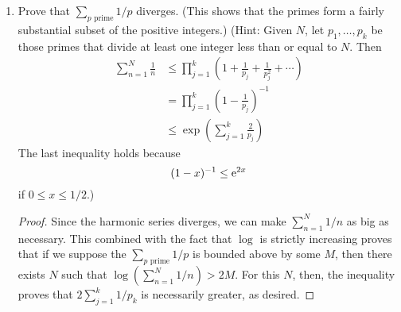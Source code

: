 \documentclass[../psets.tex]{subfiles}
\begin{document}
\begin{enumerate}[label={\textbf{\arabic*.}}]
\begin{enumerate}
\begin{proof}
            $f$ can be strictly increasing, constant, or strictly decreasing.
        \end{proof}
    \end{enumerate}
    \setcounter{enumi}{9}
    \item Prove that $\sum_{p\text{ prime}}1/p$ diverges. (This shows that the primes form a fairly substantial subset of the positive integers.) (Hint: Given $N$, let $p_1,\dots,p_k$ be those primes that divide at least one integer less than or equal to $N$. Then
    \begin{align*}
        \sum_{n=1}^N\frac{1}{n} &\leq \prod_{j=1}^k\left( 1+\frac{1}{p_j}+\frac{1}{p_j^2}+\cdots \right)\\
        &= \prod_{j=1}^k\left( 1-\frac{1}{p_j} \right)^{-1}\\
        &\leq \exp\left( \sum_{j=1}^k\frac{2}{p_j} \right)
    \end{align*}
    The last inequality holds because
    \begin{equation*}
        (1-x)^{-1} \leq \e[2x]
    \end{equation*}
    if $0\leq x\leq 1/2$.)
    \begin{proof}
        Since the harmonic series diverges, we can make $\sum_{n=1}^N1/n$ as big as necessary. This combined with the fact that $\log$ is strictly increasing proves that if we suppose the $\sum_{p\text{ prime}}1/p$ is bounded above by some $M$, then there exists $N$ such that $\log(\sum_{n=1}^N1/n)>2M$. For this $N$, then, the inequality proves that $2\sum_{j=1}^k1/p_k$ is necessarily greater, as desired.
    \end{proof}
\end{enumerate}
\end{document}
